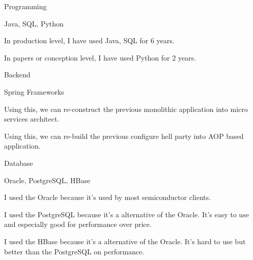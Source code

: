 

\begin{cvskills}

  \cvskill
    {Programming}
    {
      \begin{cvitems}
        \item {Java, SQL, Python}
        \item {In production level, I have used Java, SQL for 6 years.}
        \item {In papers or conception level, I have used Python for 2 years.}
      \end{cvitems}
    } %

  \cvskill
    {Backend}
    {
      \begin{cvitems}
        \item {Spring Frameworks}
        \item {Using this, we can re-construct the previous monolithic application into micro services architect.}
        \item {Using this, we can re-build the previous configure hell party into AOP based application.}
      \end{cvitems}
    }

  \cvskill
    {Database}
    {
      \begin{cvitems}
        \item {Oracle, PostgreSQL, HBase}
        \item {I used the Oracle because it's used by most semiconductor clients.}
        \item {I used the PostgreSQL because it's a alternative of the Oracle. It's easy to use and especially good for performance over price.}
        \item {I used the HBase because it's a alternative of the Oracle. It's hard to use but better than the PostgreSQL on performance.}
      \end{cvitems}
    }


\end{cvskills}
